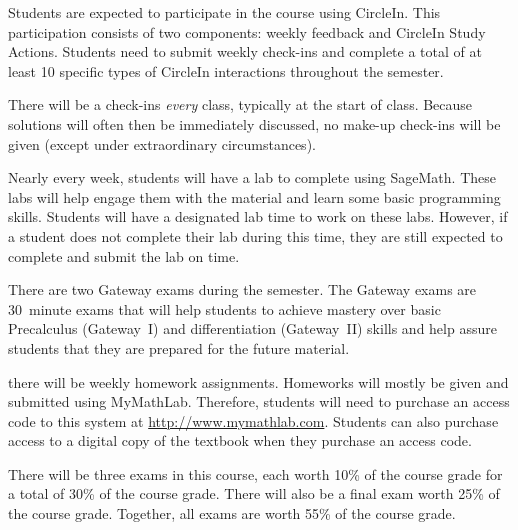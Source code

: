 \documentclass[11pt,letterpaper]{article}
\begin{document}
Students are expected to participate in the course using CircleIn. This participation consists of two components: weekly feedback and CircleIn Study Actions. Students need to submit weekly check-ins and complete a total of at least 10 specific types of CircleIn interactions throughout the semester. 
\pspace


There will be a check-ins \textit{every} class, typically at the start of class. Because solutions will often then be immediately discussed, no make-up check-ins will be given (except under extraordinary circumstances). \pspace


Nearly every week, students will have a lab to complete using SageMath. These labs will help engage them with the material and learn some basic programming skills. Students will have a designated lab time to work on these labs. However, if a student does not complete their lab during this time, they are still expected to complete and submit the lab on time.
\pspace



\newpage



There are two Gateway exams during the semester. The Gateway exams are 30~minute exams that will help students to achieve mastery over basic Precalculus (Gateway~I) and differentiation (Gateway~II) skills and help assure students that they are prepared for the future material. 
\pspace


there will be weekly homework assignments. Homeworks will mostly be given and submitted using MyMathLab. Therefore, students will need to purchase an access code to this system at \url{http://www.mymathlab.com}. Students can also purchase access to a digital copy of the textbook when they purchase an access code.
\pspace


There will be three exams in this course, each worth 10\% of the course grade for a total of 30\% of the course grade. There will also be a final exam worth 25\% of the course grade. Together, all exams are worth 55\% of the course grade. 
\pspace
\end{document}
